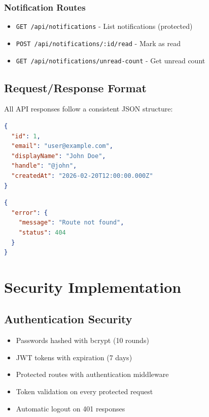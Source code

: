\documentclass[11pt,a4paper]{article}
\begin{document}
\subsubsection{Notification Routes}
\begin{itemize}[leftmargin=*]
    \item \texttt{GET /api/notifications} - List notifications (protected)
    \item \texttt{POST /api/notifications/:id/read} - Mark as read
    \item \texttt{GET /api/notifications/unread-count} - Get unread count
\end{itemize}

\subsection{Request/Response Format}

All API responses follow a consistent JSON structure:

\begin{lstlisting}[language=JSON, caption=Success Response]
{
  "id": 1,
  "email": "user@example.com",
  "displayName": "John Doe",
  "handle": "@john",
  "createdAt": "2026-02-20T12:00:00.000Z"
}
\end{lstlisting}

\begin{lstlisting}[language=JSON, caption=Error Response]
{
  "error": {
    "message": "Route not found",
    "status": 404
  }
}
\end{lstlisting}

\section{Security Implementation}

\subsection{Authentication Security}
\begin{itemize}[leftmargin=*]
    \item Passwords hashed with bcrypt (10 rounds)
    \item JWT tokens with expiration (7 days)
    \item Protected routes with authentication middleware
    \item Token validation on every protected request
    \item Automatic logout on 401 responses
\end{itemize}
\end{document}
